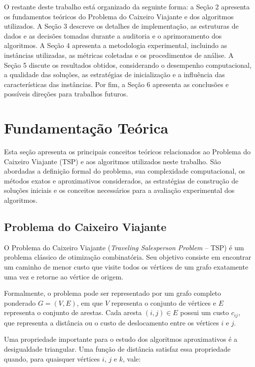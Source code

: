 \documentclass[12pt]{article}
\begin{document}
O restante deste trabalho está organizado da seguinte forma: a Seção 2 apresenta os fundamentos teóricos do Problema do Caixeiro Viajante e dos algoritmos utilizados. A Seção 3 descreve os detalhes de implementação, as estruturas de dados e as decisões tomadas durante a auditoria e o aprimoramento dos algoritmos. A Seção 4 apresenta a metodologia experimental, incluindo as instâncias utilizadas, as métricas coletadas e os procedimentos de análise. A Seção 5 discute os resultados obtidos, considerando o desempenho computacional, a qualidade das soluções, as estratégias de inicialização e a influência das características das instâncias. Por fim, a Seção 6 apresenta as conclusões e possíveis direções para trabalhos futuros.
	
	
	


\section{Fundamentação Teórica}

Esta seção apresenta os principais conceitos teóricos relacionados ao
Problema do Caixeiro Viajante (TSP) e aos algoritmos utilizados neste
trabalho. São abordadas a definição formal do problema, sua complexidade
computacional, os métodos exatos e aproximativos considerados, as
estratégias de construção de soluções iniciais e os conceitos necessários
para a avaliação experimental dos algoritmos.

\subsection{Problema do Caixeiro Viajante}

O Problema do Caixeiro Viajante (\textit{Traveling Salesperson Problem}
-- TSP) é um problema clássico de otimização combinatória. Seu objetivo
consiste em encontrar um caminho de menor custo que visite todos os vértices
de um grafo exatamente uma vez e retorne ao vértice de origem.

Formalmente, o problema pode ser representado por um grafo completo
ponderado $G=(V,E)$, em que $V$ representa o conjunto de vértices e
$E$ representa o conjunto de arestas. Cada aresta $(i,j)\in E$ possui
um custo $c_{ij}$, que representa a distância ou o custo de deslocamento
entre os vértices $i$ e $j$.

Uma propriedade importante para o estudo dos algoritmos aproximativos
é a desigualdade triangular. Uma função de distância satisfaz essa
propriedade quando, para quaisquer vértices $i$, $j$ e $k$, vale:
\end{document}
